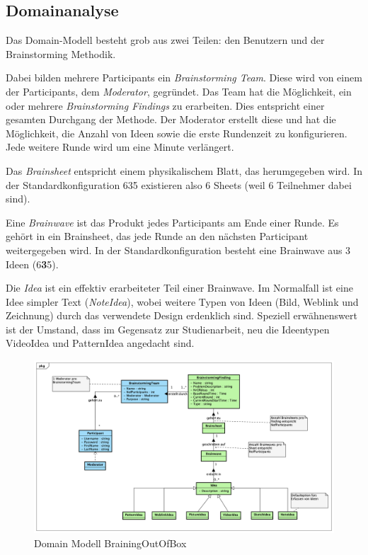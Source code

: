 \subsection{Domainanalyse}

Das Domain-Modell besteht grob aus zwei Teilen: den Benutzern und der Brainstorming Methodik. 

Dabei bilden mehrere Participants ein \textit{Brainstorming Team}. Diese wird von einem der Participants, dem \textit{Moderator}, gegründet.  Das Team hat die Möglichkeit, ein oder mehrere \textit{Brainstorming Findings} zu erarbeiten. Dies entspricht einer gesamten Durchgang der Methode. Der Moderator erstellt diese und hat die Möglichkeit, die Anzahl von Ideen sowie die erste Rundenzeit zu konfigurieren. Jede weitere Runde wird um eine Minute verlängert.

Das \textit{Brainsheet} entspricht einem physikalischem Blatt, das herumgegeben wird. In der Standardkonfiguration 635 existieren also 6 Sheets (weil 6 Teilnehmer dabei sind).

Eine \textit{Brainwave} ist das Produkt jedes Participants am Ende einer Runde. Es gehört in ein Brainsheet, das jede Runde an den nächsten Participant weitergegeben wird. In der Standardkonfiguration besteht eine Brainwave aus 3 Ideen (6\textbf{3}5).

Die \textit{Idea} ist ein effektiv erarbeiteter Teil einer Brainwave. Im Normalfall ist eine Idee simpler Text (\textit{NoteIdea}), wobei weitere Typen von Ideen (Bild, Weblink und Zeichnung) durch das verwendete Design erdenklich sind. Speziell erwähnenswert ist der Umstand, dass im Gegensatz zur Studienarbeit, neu die Ideentypen VideoIdea und PatternIdea angedacht sind.

\begin{figure}[h]
	\centering
	\includegraphics[width=1\linewidth]{img/domain-analyse/DomainModell-Methode635}
	\caption{Domain Modell BrainingOutOfBox}
	\label{fig:domainmodell-methode635}
\end{figure}

